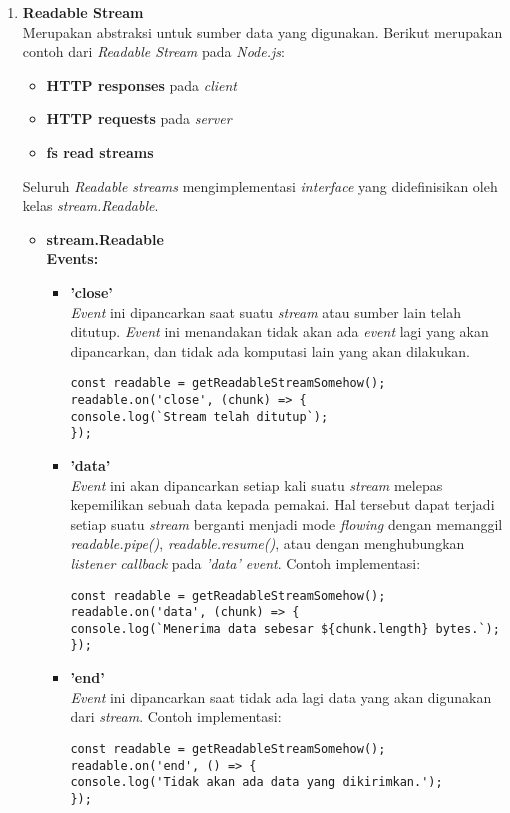 \begin{enumerate}
	\item \textbf{Readable Stream} \\
	Merupakan abstraksi untuk sumber data yang digunakan. Berikut merupakan contoh dari \textit{Readable Stream} pada \textit{Node.js}:
	\begin{itemize}
		\item \textbf{HTTP responses} pada \textit{client}
		\item \textbf{HTTP requests} pada \textit{server}
		\item \textbf{fs read streams}
	\end{itemize}
	Seluruh \textit{Readable streams} mengimplementasi \textit{interface} yang didefinisikan oleh kelas \textit{stream.Readable}.
	
	\begin{itemize}
		\item \textbf{stream.Readable} \\
		\textbf{Events:}
		\begin{itemize}
			\item \textbf{'close'} \\ \textit{Event} ini dipancarkan saat suatu \textit{stream} atau sumber lain telah ditutup. \textit{Event} ini menandakan tidak akan ada \textit{event} lagi yang akan dipancarkan, dan tidak ada komputasi lain yang akan dilakukan.
\begin{lstlisting}
const readable = getReadableStreamSomehow();
readable.on('close', (chunk) => {
console.log(`Stream telah ditutup`);
});
			\end{lstlisting}
			
			\item \textbf{'data'} \\ \textit{Event} ini akan dipancarkan setiap kali suatu \textit{stream} melepas kepemilikan sebuah data kepada pemakai. Hal tersebut dapat terjadi setiap suatu \textit{stream} berganti menjadi mode \textit{flowing} dengan memanggil \textit{readable.pipe()}, \textit{readable.resume()}, atau dengan menghubungkan \textit{listener callback} pada \textit{'data' event}. Contoh implementasi:
\begin{lstlisting}
const readable = getReadableStreamSomehow();
readable.on('data', (chunk) => {
console.log(`Menerima data sebesar ${chunk.length} bytes.`);
});
			\end{lstlisting}
			
			\item \textbf{'end'} \\ \textit{Event} ini dipancarkan saat tidak ada lagi data yang akan digunakan dari \textit{stream}. Contoh implementasi:
\begin{lstlisting}
const readable = getReadableStreamSomehow();
readable.on('end', () => {
console.log('Tidak akan ada data yang dikirimkan.');
});
\end{lstlisting}
			

\end{itemize}
\end{itemize}
\end{enumerate}
